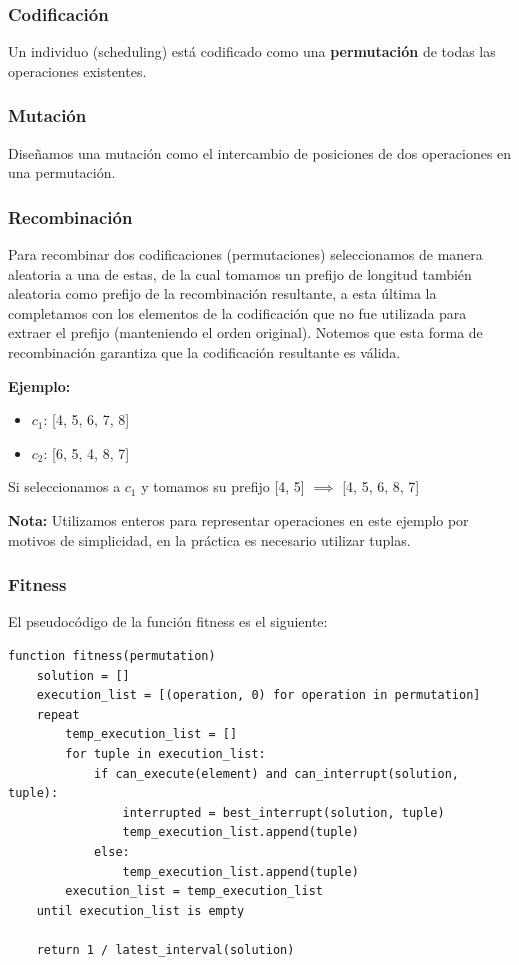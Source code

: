 \documentclass[14pt]{extarticle}
\begin{document}
\subsubsection*{Codificación}

Un individuo (scheduling) está codificado como una \textbf{permutación} de todas las operaciones existentes.

\subsubsection*{Mutación}

Diseñamos una mutación como el intercambio de posiciones de dos operaciones en una permutación.

\subsubsection*{Recombinación}

Para recombinar dos codificaciones (permutaciones) seleccionamos de manera aleatoria a una de estas, de la cual tomamos un prefijo de longitud también aleatoria como prefijo de la recombinación resultante, a esta última la completamos con los elementos de la codificación que no fue utilizada para extraer el prefijo (manteniendo el orden original). Notemos que esta forma de recombinación garantiza que la codificación resultante es válida.

\textbf{Ejemplo:}

\begin{itemize}
    \item $c_1$: [4, 5, 6, 7, 8]
    \item $c_2$: [6, 5, 4, 8, 7]
\end{itemize}

Si seleccionamos a $c_1$ y tomamos su prefijo [4, 5] $\implies$ [4, 5, 6, 8, 7]

\textbf{Nota:} Utilizamos enteros para representar operaciones en este ejemplo por motivos de simplicidad, en la práctica es necesario utilizar tuplas.

\subsubsection*{Fitness}

El pseudocódigo de la función fitness es el siguiente:

\begin{verbatim}
function fitness(permutation)
    solution = []
    execution_list = [(operation, 0) for operation in permutation]
    repeat
        temp_execution_list = []
        for tuple in execution_list:
            if can_execute(element) and can_interrupt(solution, tuple):
                interrupted = best_interrupt(solution, tuple)
                temp_execution_list.append(tuple)
            else:
                temp_execution_list.append(tuple)
        execution_list = temp_execution_list
    until execution_list is empty

    return 1 / latest_interval(solution)
\end{verbatim}
\end{document}
